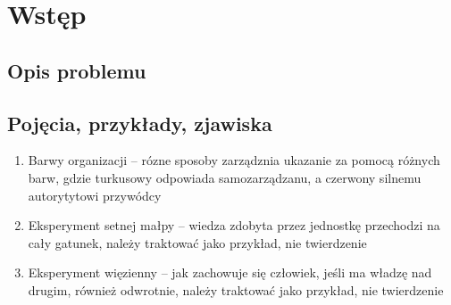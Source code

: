 \documentclass[11pt]{aghdpl}
\author{Mateusz Grzeliński, Kornel Wilk, Mateusz Szymkowski}
\date{2018}
\begin{document}
\titlepages

{
        \fancyhf{}
        \renewcommand{\headrulewidth}{0pt}
        \renewcommand{\footrulewidth}{0pt}
}

\setcounter{tocdepth}{2}
\tableofcontents
\clearpage

\chapter{Wstęp}
\section{Opis problemu}

\section{Pojęcia, przykłady, zjawiska}
\begin{enumerate}
\item Barwy organizacji \cite{ReinventingOrganizations} -- rózne sposoby zarządznia ukazanie za pomocą różnych barw, gdzie turkusowy odpowiada samozarządzanu, a czerwony silnemu autorytytowi przywódcy
\item Eksperyment setnej małpy \cite{EksperymentSetnejMalpy} -- wiedza zdobyta przez jednostkę przechodzi na cały gatunek, należy traktować jako przykład, nie twierdzenie
\item Eksperyment więzienny \cite{EksperymentWiezienny} -- jak zachowuje się człowiek, jeśli ma władzę nad drugim, również odwrotnie, należy traktować jako przykład, nie twierdzenie


\end{enumerate}
\end{document}
